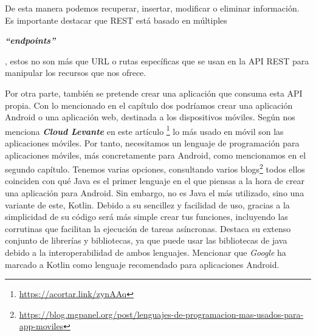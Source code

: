 De esta manera podemos recuperar, insertar, modificar o eliminar información. Es importante destacar que REST está basado en múltiples \begin{otherlanguage}{english}\textit{\textbf{``endpoints''}}\end{otherlanguage}, estos no son más que URL o rutas específicas que se usan en la API REST para manipular los recursos que nos ofrece.

Por otra parte, también se pretende crear una aplicación que consuma esta API propia. Con lo mencionado en el capítulo dos podríamos crear una aplicación Android o una aplicación web, destinada a los dispositivos móviles. Según nos menciona \textbf{\textit{Cloud Levante}} en este artículo \footnote{\url{https://acortar.link/zynAAq}} lo más usado en móvil son las aplicaciones móviles. Por tanto, necesitamos un lenguaje de programación para aplicaciones móviles, más concretamente para Android, como mencionamos en el segundo capítulo. Tenemos varias opciones, consultando varios blogs\footnote{\url{https://blog.mgpanel.org/post/lenguajes-de-programacion-mas-usados-para-app-moviles}} todos ellos coinciden con qué Java es el primer lenguaje en el que piensas a la hora de crear una aplicación para Android. Sin embargo, no es Java el más utilizado, sino una variante de este, Kotlin. Debido a su sencillez y facilidad de uso, gracias a la simplicidad de su código será más simple crear tus funciones, incluyendo las corrutinas que facilitan la ejecución de tareas asíncronas. Destaca su extenso conjunto de librerías y bibliotecas, ya que puede usar las bibliotecas de java debido a la interoperabilidad de ambos lenguajes. Mencionar que \textit{Google} ha marcado a Kotlin como lenguaje recomendado para aplicaciones Android.

